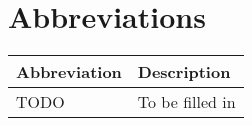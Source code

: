 \section*{Abbreviations}

\begin{longtable}[l]{p{} p{}}
    \textbf{Abbreviation} & \textbf{Description} \\
    \hline
    TODO & To be filled in \\
    \hline
\end{longtable}

\clearpage